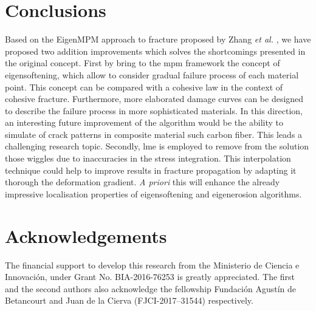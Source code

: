 \documentclass[preprint,12pt,a4paper]{elsarticle}
\begin{document}
\section{Conclusions}
\label{sec:4}
Based on the EigenMPM approach to fracture proposed by Zhang {\it et al.}
\cite{Zhang_EE_2020}, we have proposed two addition improvements which
solves the shortcomings presented in the original concept. First by
bring to the \acrshort{mpm} framework the concept of eigensoftening,
which allow to consider gradual failure process of each material
point. This concept can be compared with a cohesive law in the context
of cohesive fracture. Furthermore, more elaborated damage curves can
be designed to describe the failure process in more sophisticated
materials. In this direction, an interesting future improvement of the
algorithm would be the ability to simulate of crack patterns in
composite material such carbon fiber. This leads a challenging
research topic. Secondly, \acrshort{lme} is employed to remove from
the solution those wiggles due to inaccuracies in the stress
integration. This interpolation technique could help to improve
results in fracture propagation by adapting it thorough the
deformation gradient. \textit{A priori} this will enhance the already
impressive localisation properties of eigensoftening and eigenerosion
algorithms. 

\section*{Acknowledgements}
The financial support to develop this research from the Ministerio de
Ciencia e Innovaci\'on, under Grant No. BIA-2016-76253 is greatly
appreciated. The first and the second authors also acknowledge the
fellowship Fundaci\'on Agust\'in de Betancourt and Juan de la Cierva
(FJCI-2017–31544) respectively.

\appendix
\end{document}
